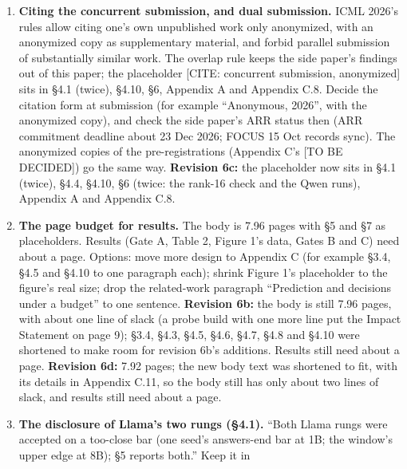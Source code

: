 \documentclass{article}
\theoremstyle{plain}
\theoremstyle{definition}
\theoremstyle{remark}
\begin{document}
\begin{enumerate}
        generated answers to harm prompts or not; anchor text; the planted rows'
        identifiers. The repository rule (no rows, prompts, answers or anchor
        text in git) is about git, not a release.
  \item \textbf{Citing the concurrent submission, and dual submission.} ICML
        2026's rules allow citing one's own unpublished work only anonymized,
        with an anonymized copy as supplementary material, and forbid parallel
        submission of substantially similar work. The overlap rule keeps the
        side paper's findings out of this paper; the placeholder [CITE:
        concurrent submission, anonymized] sits in \S{}4.1 (twice), \S{}4.10,
        \S{}6, Appendix A and Appendix C.8. Decide the citation form at
        submission (for example ``Anonymous, 2026'', with the anonymized copy),
        and check the side paper's ARR status then (ARR commitment deadline
        about 23 Dec 2026; FOCUS 15 Oct records sync). The anonymized copies of
        the pre-registrations (Appendix C's [TO BE DECIDED]) go the same way.
        \textbf{Revision 6c:} the placeholder now sits in \S{}4.1 (twice),
        \S{}4.4, \S{}4.10, \S{}6 (twice: the rank-16 check and the Qwen runs),
        Appendix A and Appendix C.8.
  \item \textbf{The page budget for results.} The body is 7.96 pages with \S{}5
        and \S{}7 as placeholders. Results (Gate A, Table 2, Figure 1's data,
        Gates B and C) need about a page. Options: move more design to Appendix
        C (for example \S{}3.4, \S{}4.5 and \S{}4.10 to one paragraph each);
        shrink Figure 1's placeholder to the figure's real size; drop the
        related-work paragraph ``Prediction and decisions under a budget'' to
        one sentence. \textbf{Revision 6b:} the body is still 7.96 pages, with
        about one line of slack (a probe build with one more line put the Impact
        Statement on page 9); \S{}3.4, \S{}4.3, \S{}4.5, \S{}4.6, \S{}4.7,
        \S{}4.8 and \S{}4.10 were shortened to make room for revision 6b's
        additions. Results still need about a page. \textbf{Revision 6d:} 7.92
        pages; the new body text was shortened to fit, with its details in
        Appendix C.11, so the body still has only about two lines of slack, and
        results still need about a page.
  \item \textbf{The disclosure of Llama's two rungs (\S{}4.1).} ``Both Llama
        rungs were accepted on a too-close bar (one seed's answers-end bar at
        1B; the window's upper edge at 8B); \S{}5 reports both.'' Keep it in

\end{enumerate}
\end{document}
